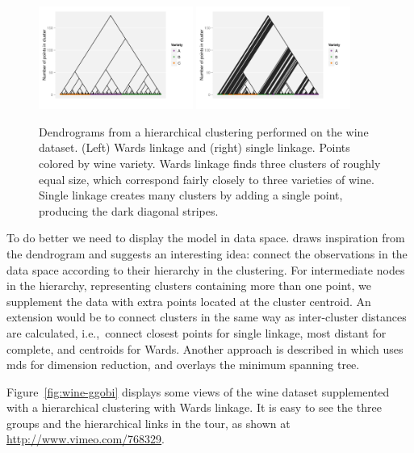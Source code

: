 \documentclass[preprint]{imsart}
\begin{document}
\begin{figure}[htbp]
  \centering
    \includegraphics[width=0.45\textwidth]{wine-ward}
    \includegraphics[width=0.45\textwidth]{wine-single}
  \caption{Dendrograms from a hierarchical clustering performed on the wine dataset.  (Left) Wards linkage and (right) single linkage.  Points colored by wine variety.  Wards linkage finds three clusters of roughly equal size, which correspond fairly closely to three varieties of wine.  Single linkage creates many clusters by adding a single point, producing the dark diagonal stripes. }
  \label{fig:wine-dendro}
\end{figure}

To do better we need to display the model in data space.  \citet{buja:1996} draws inspiration from the dendrogram and suggests an interesting idea: connect the observations in the data space according to their hierarchy in the clustering.  For intermediate nodes in the hierarchy, representing clusters containing more than one point, we supplement the data with extra points located at the cluster centroid.   An extension would be to connect clusters in the same way as inter-cluster distances are calculated, i.e.,\ connect closest points for single linkage, most distant for complete, and centroids for Wards.  Another approach is described in \citet{kim:2000} which uses {\sc mds} for dimension reduction, and overlays the minimum spanning tree.

Figure~\ref{fig:wine-ggobi} displays some views of the wine dataset supplemented with a hierarchical clustering with Wards linkage.  It is easy to see the three groups and the hierarchical links in the tour, as shown at \url{http://www.vimeo.com/768329}.
\end{document}
